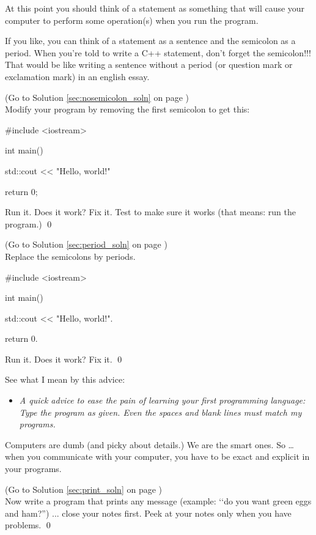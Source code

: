 At this point you should think of a statement as something that will cause 
your computer to perform some operation(s) when you run the program.

If you like, you can think of a statement as a sentence and the semicolon as a
period. When you're told to write a C++ statement, don't forget the 
semicolon!!! 
That would be like writing a sentence without a period (or question mark or 
exclamation mark) in an english essay.


\begin{ex}
\label{sec:nosemicolon}
(Go to Solution \ref{sec:nosemicolon_soln} 
on page \pageref{sec:nosemicolon_soln}) 
\\
Modify your program by removing the first semicolon to get this:
\begin{console}
#include <iostream>

int main()
{
    std::cout << "Hello, world!\n"

    return 0;
}
\end{console}
Run it. 
Does it work? 
Fix it. 
Test to make sure it works (that means: run the program.)
\qed
\end{ex}


\begin{ex}
\label{sec:period}
(Go to Solution \ref{sec:period_soln} 
on page \pageref{sec:period_soln}) 
\\
Replace the semicolons by periods.
\begin{console}
#include <iostream>

int main()
{
    std::cout << "Hello, world!\n".

    return 0.
}
\end{console}
Run it. Does it work? Fix it.
\qed
\end{ex}

See what I mean by this advice:

\begin{itemize}
\item[]
\textit{A quick advice to ease the pain of learning your first programming 
language: Type the program 
 as given. 
Even the spaces and blank lines must match my programs.}
\end{itemize}

Computers are dumb (and picky about details.) 
We are the smart ones. So … when you communicate with your computer, 
you have to be exact and explicit in your programs.


\begin{ex} 
\label{sec:print}
(Go to Solution \ref{sec:print_soln} 
on page \pageref{sec:print_soln}) 
\\
Now write a program that prints any message 
(example: \lq\lq do you want green eggs and ham?'') ... 
close your notes first. Peek at your notes only when you have problems.
\qed
\end{ex}



